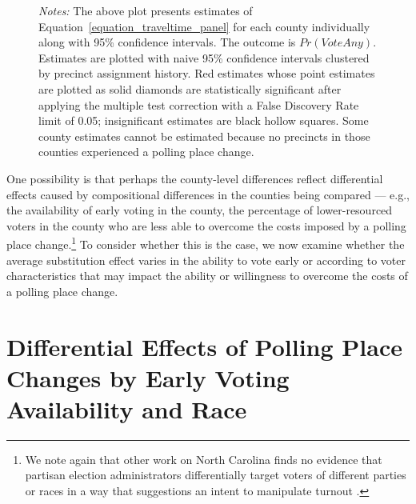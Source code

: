 \documentclass{cup_PSRM}
\begin{document}
\begin{figure}[t!]
\begin{center}
		\label{county_any}
		\end{center}
	\scriptsize{\emph{Notes:}  The above plot presents estimates of Equation~\ref{equation_traveltime_panel} for each county individually along with 95\% confidence intervals.  The outcome is $Pr(VoteAny)$.  Estimates are plotted with naive 95\% confidence intervals clustered by precinct assignment history. Red estimates whose point estimates are plotted as solid diamonds are statistically significant after applying the \citet{Benjamini:2006gd} multiple test correction with a False Discovery Rate limit of 0.05; insignificant estimates are black hollow squares.  Some county estimates cannot be estimated because no precincts in those counties experienced a polling place change. }
\end{figure} \normalsize

One possibility is that perhaps the county-level differences reflect differential effects caused by compositional differences in the counties being compared --- e.g., the availability of early voting in the county, the percentage of lower-resourced voters in the county who are less able to overcome the costs imposed by a polling place change.\footnote{We note again that other work on North Carolina finds no evidence that partisan election administrators differentially target voters of different parties or races in a way that suggestions an intent to manipulate turnout \citep{clintontargering2018}.}  To consider whether this is the case, we now examine whether the average substitution effect varies in the ability to vote early or according to voter characteristics that may impact the ability or willingness to overcome the costs of a polling place change.






\section{Differential Effects of Polling Place Changes by Early Voting Availability and Race}\label{section_heterogeneity}
\end{document}
